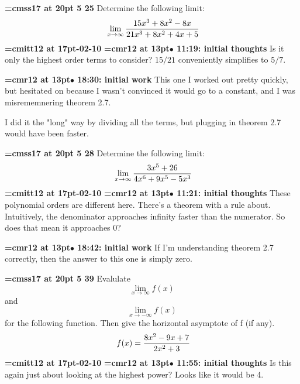 {\medskip\noindent\bf\font\titlefont=cmss17 at 20pt 5 25}\medskip
Determine the following limit:
$$\
\lim_{x \to \infty}{
15x^3 + 8x^2 - 8x
\over
21x^3 + 8x^2 + 4x + 5
}
$$
{\medskip\noindent\bf\font\titlefont=cmitt12 at 17pt-02-10}\medskip
{\smallskip\noindent\bf\font\titlefont=cmr12 at 13pt\titlefont $\bullet$ 11:19: initial thoughts}\smallskip
Is it only the highest order terms to consider? $15/21$ conveniently simplifies to $5/7$.
\par

{\smallskip\noindent\bf\font\titlefont=cmr12 at 13pt\titlefont $\bullet$ 18:30: initial work}\smallskip
This one I worked out pretty quickly, but hesitated on because I wasn't convinced it would go to a constant, and I was misrememnering theorem 2.7.
\par

I did it the "long" way by dividing all the terms, but plugging in theorem 2.7 would have been faster.
\par

{\medskip\noindent\bf\font\titlefont=cmss17 at 20pt 5 28}\medskip
Determine the following limit:
$$\
\lim_{x \to \infty} {
3x^5 + 26
\over
4x^6 + 9x^5 - 5x^3
}
$$
{\medskip\noindent\bf\font\titlefont=cmitt12 at 17pt-02-10}\medskip
{\smallskip\noindent\bf\font\titlefont=cmr12 at 13pt\titlefont $\bullet$ 11:21: initial thoughts}\smallskip
These polynomial orders are different here. There's a theorem with a rule about. Intuitively, the denominator approaches infinity faster than the numerator. So does that mean it approaches 0?
\par

{\smallskip\noindent\bf\font\titlefont=cmr12 at 13pt\titlefont $\bullet$ 18:42: initial work}\smallskip
If I'm understanding theorem 2.7 correctly, then the answer to this one is simply zero.
\par

{\medskip\noindent\bf\font\titlefont=cmss17 at 20pt 5 39}\medskip
Evalulate
$$\lim_{x \to \infty}{f(x)}$$
and
$$\lim_{x \to -\infty}{f(x)}$$
for the following function. Then give the
horizontal asymptote of f (if any).
$$\
f(x) = {
8x^2 - 9x + 7
\over
2x^2 + 3
}
$$
{\medskip\noindent\bf\font\titlefont=cmitt12 at 17pt-02-10}\medskip
{\smallskip\noindent\bf\font\titlefont=cmr12 at 13pt\titlefont $\bullet$ 11:55: initial thoughts}\smallskip
Is this again just about looking at the highest power? Looks like it would be 4.
\par

